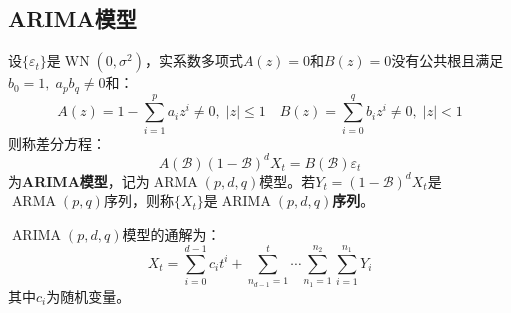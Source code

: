 \subsection{ARIMA模型}
\begin{definition}
	设$\{\varepsilon_t\}$是$\operatorname{WN}(0,\sigma^2)$，实系数多项式$A(z)=0$和$B(z)=0$没有公共根且满足$b_0=1,\;a_pb_q\ne0$和：
	\begin{equation*}
		A(z)=1-\sum_{i=1}^{p}a_iz^i\ne0,\;|z|\leqslant1\quad B(z)=\sum_{i=0}^{q}b_iz^i\ne0,\;|z|<1
	\end{equation*}
	则称差分方程：
	\begin{equation*}
		A(\mathcal{B})(1-\mathcal{B})^dX_t=B(\mathcal{B})\varepsilon_t
	\end{equation*}
	为\textbf{ARIMA模型}，记为$\operatorname{ARMA}(p,d,q)$模型。若$Y_t=(1-\mathcal{B})^dX_t$是$\operatorname{ARMA}(p,q)$序列，则称$\{X_t\}$是\textbf{$\operatorname{ARIMA}(p,d,q)$序列}。
\end{definition}
\begin{theorem}
	$\operatorname{ARIMA}(p,d,q)$模型的通解为：
	\begin{equation*}
		X_t=\sum_{i=0}^{d-1}c_it^{i}+\sum_{n_{d-1}=1}^{t}\cdots\sum_{n_1=1}^{n_2}\sum_{i=1}^{n_1}Y_i
	\end{equation*}
	其中$c_i$为随机变量。
\end{theorem}
